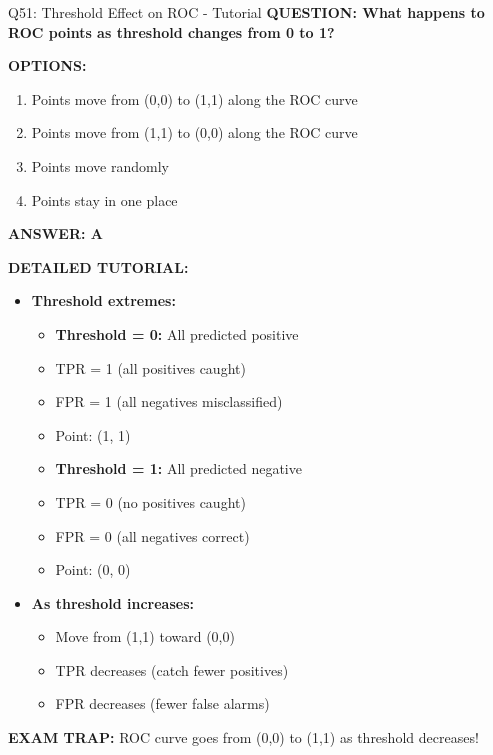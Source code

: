 \documentclass[8pt]{beamer}
\begin{document}
	\begin{frame}{Q51: Threshold Effect on ROC - Tutorial}
		\fontsize{6.5}{7.5}\selectfont
		\textbf{QUESTION: What happens to ROC points as threshold changes from 0 to 1?}
		
		\vspace{0.1cm}
		\textbf{OPTIONS:}
		\begin{enumerate}
			\item Points move from (0,0) to (1,1) along the ROC curve
			\item Points move from (1,1) to (0,0) along the ROC curve
			\item Points move randomly
			\item Points stay in one place
		\end{enumerate}
		
		\vspace{0.1cm}
		\textcolor{myblue}{\textbf{ANSWER: A}}
		
		\vspace{0.1cm}
		\textbf{DETAILED TUTORIAL:}
		\begin{itemize}
			\item \textbf{Threshold extremes:}
			\begin{itemize}
				\item \textbf{Threshold = 0:} All predicted positive
				\item TPR = 1 (all positives caught)
				\item FPR = 1 (all negatives misclassified)
				\item Point: (1, 1)
			\end{itemize}
			\begin{itemize}
				\item \textbf{Threshold = 1:} All predicted negative
				\item TPR = 0 (no positives caught)
				\item FPR = 0 (all negatives correct)
				\item Point: (0, 0)
			\end{itemize}
			\item \textbf{As threshold increases:}
			\begin{itemize}
				\item Move from (1,1) toward (0,0)
				\item TPR decreases (catch fewer positives)
				\item FPR decreases (fewer false alarms)
			\end{itemize}
		\end{itemize}
		
		\textcolor{myred}{\textbf{EXAM TRAP:}} ROC curve goes from \textcolor{myblue}{(0,0) to (1,1)} as threshold decreases!
	\end{frame}
	
\end{document}
